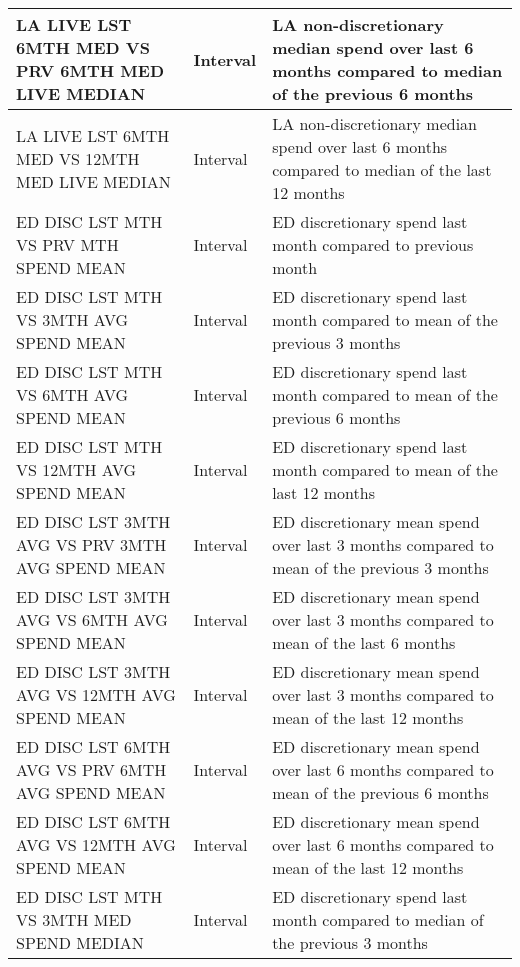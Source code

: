 \begin{longtable}{|p{5.5cm}|l|p{6.5cm}|}
	LA LIVE LST 6MTH MED VS PRV 6MTH MED LIVE MEDIAN  & Interval           & LA non-discretionary median spend over last 6 months compared to median of the previous 6 months \\ \hline
	LA LIVE LST 6MTH MED VS 12MTH MED LIVE MEDIAN      & Interval           & LA non-discretionary median spend over last 6 months compared to median of the last 12 months    \\ \hline
	ED DISC LST MTH VS PRV MTH SPEND MEAN               & Interval           & ED discretionary spend last month compared to previous month                                     \\ \hline
	ED DISC LST MTH VS 3MTH AVG SPEND MEAN              & Interval           & ED discretionary spend last month compared to mean of the previous 3 months                      \\ \hline
	ED DISC LST MTH VS 6MTH AVG SPEND MEAN              & Interval           & ED discretionary spend last month compared to mean of the previous 6 months                      \\ \hline
	ED DISC LST MTH VS 12MTH AVG SPEND MEAN             & Interval           & ED discretionary spend last month compared to mean of the last 12 months                         \\ \hline
	ED DISC LST 3MTH AVG VS PRV 3MTH AVG SPEND MEAN   & Interval           & ED discretionary mean spend over last 3 months compared to mean of the previous 3 months         \\ \hline
	ED DISC LST 3MTH AVG VS 6MTH AVG SPEND MEAN        & Interval           & ED discretionary mean spend over last 3 months compared to mean of the last 6 months             \\ \hline
	ED DISC LST 3MTH AVG VS 12MTH AVG SPEND MEAN       & Interval           & ED discretionary mean spend over last 3 months compared to mean of the last 12 months            \\ \hline
	ED DISC LST 6MTH AVG VS PRV 6MTH AVG SPEND MEAN   & Interval           & ED discretionary mean spend over last 6 months compared to mean of the previous 6 months         \\ \hline
	ED DISC LST 6MTH AVG VS 12MTH AVG SPEND MEAN       & Interval           & ED discretionary mean spend over last 6 months compared to mean of the last 12 months            \\ \hline
	ED DISC LST MTH VS 3MTH MED SPEND MEDIAN            & Interval           & ED discretionary spend last month compared to median of the previous 3 months                    \\ \hline

\end{longtable}
